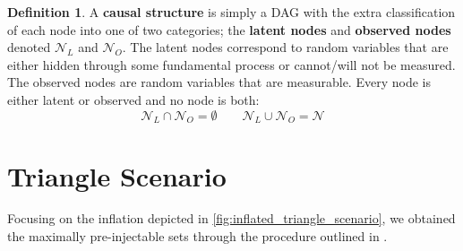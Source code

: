 \documentclass[aps, 10pt, english, twoside, pra, nofootinbib, longbibliography]{revtex4-1}
\theoremstyle{plain}
\theoremstyle{definition}
\newtheorem{definition}[theorem]{Definition}
\theoremstyle{remark}
\newcommand{\nodes}{\mathcal{N}}
\newcommand{\term}[1]{\textcolor{Mahogany}{\textbf{#1}}}
\begin{document}
    \begin{definition}
        A \term{causal structure} is simply a DAG with the extra classification of each node into one of two categories; the \term{latent nodes} and \term{observed nodes} denoted $\nodes_L$ and $\nodes_O$. The latent nodes correspond to random variables that are either hidden through some fundamental process or cannot/will not be measured. The observed nodes are random variables that are measurable. Every node is either latent or observed and no node is both:
        \[ \nodes_L \cap \nodes_O = \emptyset \qquad \nodes_L \cup \nodes_O = \nodes \]
    \end{definition}


    \section{Triangle Scenario}
    Focusing on the inflation depicted in \cref{fig:inflated_triangle_scenario}, we obtained the maximally pre-injectable sets through the procedure outlined in \cite{Inflation}.
\end{document}
